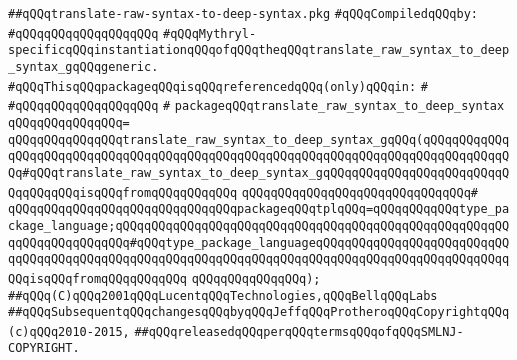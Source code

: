 \label{src/lib/compiler/front/semantic/typecheck/translate-raw-syntax-to-deep-syntax.pkg}
\verb|##qQQqtranslate-raw-syntax-to-deep-syntax.pkg|\newline
\newline
\verb|#qQQqCompiledqQQqby:|\newline
\verb|#qQQqqQQqqQQqqQQqqQQq|\newline
\newline
\newline
\newline
\verb|#qQQqMythryl-specificqQQqinstantiationqQQqofqQQqtheqQQqtranslate_raw_syntax_to_deep_syntax_gqQQqgeneric.|\newline
\newline
\verb|#qQQqThisqQQqpackageqQQqisqQQqreferencedqQQq(only)qQQqin:|\newline
\verb|#|\newline
\verb|#qQQqqQQqqQQqqQQqqQQq|\newline
\verb|#|\newline
\verb|packageqQQqtranslate_raw_syntax_to_deep_syntax|\newline
\verb|qQQqqQQqqQQqqQQq=|\newline
\verb|qQQqqQQqqQQqqQQqtranslate_raw_syntax_to_deep_syntax_gqQQq(qQQqqQQqqQQqqQQqqQQqqQQqqQQqqQQqqQQqqQQqqQQqqQQqqQQqqQQqqQQqqQQqqQQqqQQqqQQqqQQqqQQq#qQQqtranslate_raw_syntax_to_deep_syntax_gqQQqqQQqqQQqqQQqqQQqqQQqqQQqqQQqqQQqisqQQqfromqQQqqQQqqQQq|\newline
\verb|qQQqqQQqqQQqqQQqqQQqqQQqqQQqqQQq#|\newline
\verb|qQQqqQQqqQQqqQQqqQQqqQQqqQQqqQQqpackageqQQqtplqQQq=qQQqqQQqqQQqtype_package_language;qQQqqQQqqQQqqQQqqQQqqQQqqQQqqQQqqQQqqQQqqQQqqQQqqQQqqQQqqQQqqQQqqQQqqQQq#qQQqtype_package_languageqQQqqQQqqQQqqQQqqQQqqQQqqQQqqQQqqQQqqQQqqQQqqQQqqQQqqQQqqQQqqQQqqQQqqQQqqQQqqQQqqQQqqQQqqQQqqQQqqQQqisqQQqfromqQQqqQQqqQQq|\newline
\verb|qQQqqQQqqQQqqQQq);|\newline
\newline
\newline
\newline
\verb|##qQQq(C)qQQq2001qQQqLucentqQQqTechnologies,qQQqBellqQQqLabs|\newline
\verb|##qQQqSubsequentqQQqchangesqQQqbyqQQqJeffqQQqProtheroqQQqCopyrightqQQq(c)qQQq2010-2015,|\newline
\verb|##qQQqreleasedqQQqperqQQqtermsqQQqofqQQqSMLNJ-COPYRIGHT.|\newline

